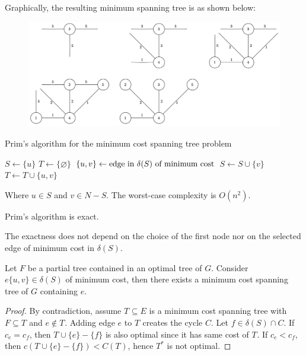 \begin{example}
    Graphically, the resulting minimum spanning tree is as shown below:
    \begin{figure}[H]
        \centering
        \includegraphics[width=0.8\linewidth]{images/MST.png}
    \end{figure}
\end{example}
\begin{algorithm}[H]
    \caption{Prim's algorithm for the minimum cost spanning tree problem}
        \begin{algorithmic}[1]
            \State $S \leftarrow \{u\}$
            \State $T \leftarrow \{\varnothing\}$
                \State $\{u,v\}\leftarrow \textnormal{edge in } \delta(S) \textnormal{ of minimum cost}$
                \State $S \leftarrow S \cup \{v\}$
                \State $T \leftarrow T \cup \{u,v\}$
            \EndWhile
        \end{algorithmic}
\end{algorithm}
Where $u \in S$ and $v \in N-S$. 
The worst-case complexity is $O(n^2)$. 
\newpage
\begin{proposition}
    Prim's algorithm is exact. 
\end{proposition}        
The exactness does not depend on the choice of the first node nor on the selected edge of minimum cost in $\delta(S)$. 
\begin{property}
    Let $F$ be a partial tree contained in an optimal tree of $G$. 
    Consider $e\{u,v\}\in \delta(S)$ of minimum cost, then there exists a minimum cost spanning tree of $G$ containing $e$. 
\end{property}
\begin{proof}
    By contradiction, assume $T^{} \subseteq E$ is a minimum cost spanning tree with $F \subseteq T^{}$ and $e \notin T^{}$. 
    Adding edge $e$ to $T^{}$ creates the cycle $C$. 
    Let $f \in \delta(S) \cap C$.
    If $c_e=c_f$, then $T^{}\cup\{e\}-\{f\}$ is also optimal since it has same cost of $T^{}$.
    If $c_e<c_f$, then $c\left(T^{}\cup\{e\}-\{f\}\right)<C(T^{})$, hence $T^{*}$ is not optimal.
\end{proof}
